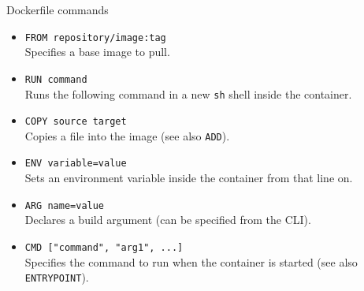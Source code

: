 \begin{frame}{Dockerfile commands}
  \justifying
	\begin{itemize}
		\item \texttt{FROM repository/image:tag}\\Specifies a base image to pull.
		\item \texttt{RUN command}\\Runs the following command in a new \texttt{sh} shell inside the container.
		\item \texttt{COPY source target}\\Copies a file into the image (see also \texttt{ADD}).
		\item \texttt{ENV variable=value}\\Sets an environment variable inside the container from that line on.
		\item \texttt{ARG name=value}\\Declares a build argument (can be specified from the CLI).
		\item \texttt{CMD ["command", "arg1", ...]}\\Specifies the command to run when the container is started (see also \texttt{ENTRYPOINT}).
	\end{itemize}
\end{frame}

